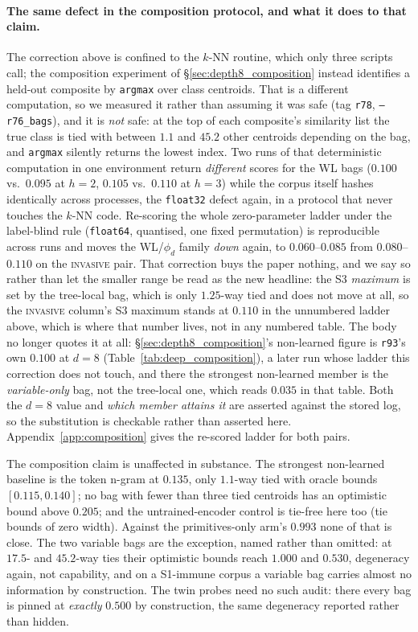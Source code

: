 \paragraph{The same defect in the composition protocol, and what it does to that claim.} The correction above is confined to the $k$-NN routine, which only three scripts call; the composition experiment of \S\ref{sec:depth8_composition} instead identifies a held-out composite by \texttt{argmax} over class centroids. That is a different computation, so we measured it rather than assuming it was safe (tag \texttt{r78}, \texttt{--r76\_bags}), and it is \emph{not} safe: at the top of each composite's similarity list the true class is tied with between $1.1$ and $45.2$ other centroids depending on the bag, and \texttt{argmax} silently returns the lowest index. Two runs of that deterministic computation in one environment return \emph{different} scores for the WL bags ($0.100$ vs.\ $0.095$ at $h{=}2$, $0.105$ vs.\ $0.110$ at $h{=}3$) while the corpus itself hashes identically across processes, the \texttt{float32} defect again, in a protocol that never touches the $k$-NN code. Re-scoring the whole zero-parameter ladder under the label-blind rule (\texttt{float64}, quantised, one fixed permutation) is reproducible across runs and moves the WL/$\phi_d$ family \emph{down} again, to $0.060$--$0.085$ from $0.080$--$0.110$ on the \textsc{invasive} pair. That correction buys the paper nothing, and we say so rather than let the smaller range be read as the new headline: the S3 \emph{maximum} is set by the tree-local bag, which is only $1.25$-way tied and does not move at all, so the \textsc{invasive} column's S3 maximum stands at $0.110$ in the unnumbered ladder above, which is where that number lives, not in any numbered table. The body no longer quotes it at all: \S\ref{sec:depth8_composition}'s non-learned figure is \texttt{r93}'s own $0.100$ at $d{=}8$ (Table~\ref{tab:deep_composition}), a later run whose ladder this correction does not touch, and there the strongest non-learned member is the \emph{variable-only} bag, not the tree-local one, which reads $0.035$ in that table. Both the $d{=}8$ value and \emph{which member attains it} are asserted against the stored log, so the substitution is checkable rather than asserted here. Appendix~\ref{app:composition} gives the re-scored ladder for both pairs.

The composition claim is unaffected in substance. The strongest non-learned baseline is the token n-gram at $0.135$, only $1.1$-way tied with oracle bounds $[0.115, 0.140]$; no bag with fewer than three tied centroids has an optimistic bound above $0.205$; and the untrained-encoder control is tie-free here too (tie bounds of zero width). Against the primitives-only arm's $0.993$ none of that is close. The two variable bags are the exception, named rather than omitted: at $17.5$- and $45.2$-way ties their optimistic bounds reach $1.000$ and $0.530$, degeneracy again, not capability, and on a S1-immune corpus a variable bag carries almost no information by construction. The twin probes need no such audit: there every bag is pinned at \emph{exactly} $0.500$ by construction, the same degeneracy reported rather than hidden.

